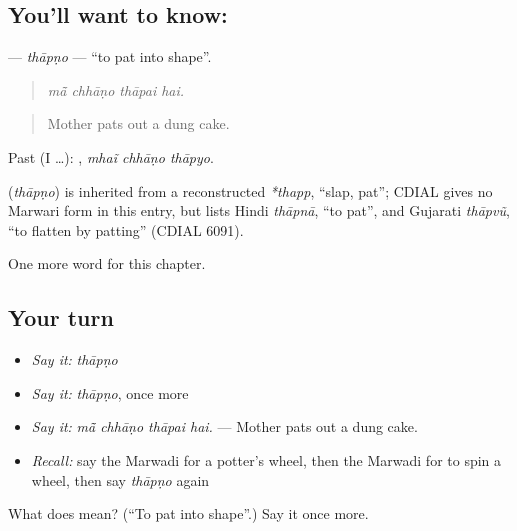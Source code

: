 \subsection*{You'll want to know: }
\textbf{} — \emph{thāpṇo} — \textquotedblleft{}to pat into shape\textquotedblright{}.

\begin{quote}
   
\end{quote}

\begin{quote}
\emph{mā̃ chhāṇo thāpai hai.}
\end{quote}

\begin{quote}
Mother pats out a dung cake.
\end{quote}

Past (I …):   , \emph{mhaĩ chhāṇo thāpyo}.

\begin{cousinweb}
\textbf{} (\emph{thāpṇo}) is inherited from a reconstructed \emph{*thapp}, \textquotedblleft{}slap, pat\textquotedblright{}; CDIAL gives no Marwari form in this entry, but lists Hindi \emph{thāpnā}, \textquotedblleft{}to pat\textquotedblright{}, and Gujarati \emph{thāpvũ}, \textquotedblleft{}to flatten by patting\textquotedblright{} (CDIAL 6091).
\end{cousinweb}

\begin{grammarlens}[title={What you've built}]
One more word for this chapter.
\end{grammarlens}

\subsection*{Your turn}
\begin{itemize}
\raggedright
  \item \emph{Say it:} \emph{thāpṇo}
  \item \emph{Say it:} \emph{thāpṇo}, once more
  \item \emph{Say it:} \emph{mā̃ chhāṇo thāpai hai.} — Mother pats out a dung cake.
  \item \emph{Recall:} say the Marwadi for a potter's wheel, then the Marwadi for to spin a wheel, then say \emph{thāpṇo} again
\end{itemize}

\begin{tcolorbox}[breakable,colback=teal!4,colframe=teal!35!black,title={Before you move on}]
What does  mean? (\textquotedblleft{}To pat into shape\textquotedblright{}.) Say it once more.
\end{tcolorbox}
